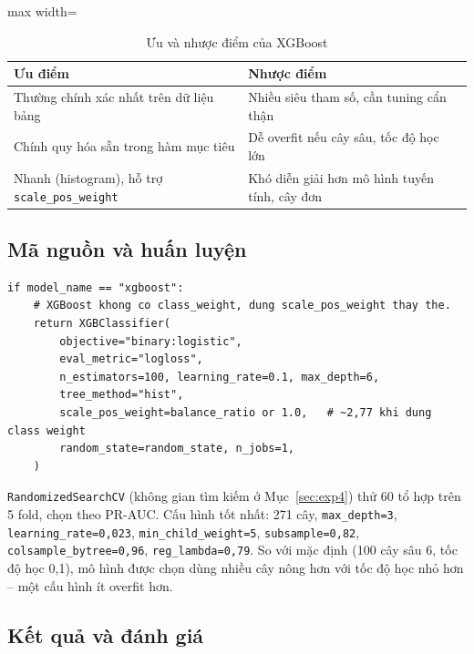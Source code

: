 \begin{table}[H]
\centering
\begin{adjustbox}{max width=\textwidth}
\begin{tabular}{|p{7cm}|p{7cm}|}
\hline
\textbf{Ưu điểm} & \textbf{Nhược điểm} \\
\hline
Thường chính xác nhất trên dữ liệu bảng & Nhiều siêu tham số, cần tuning cẩn thận \\
\hline
Chính quy hóa sẵn trong hàm mục tiêu & Dễ overfit nếu cây sâu, tốc độ học lớn \\
\hline
Nhanh (histogram), hỗ trợ \texttt{scale\_pos\_weight} & Khó diễn giải hơn mô hình tuyến tính, cây đơn \\
\hline
\end{tabular}
\end{adjustbox}
\caption{Ưu và nhược điểm của XGBoost}
\end{table}

\subsection{Mã nguồn và huấn luyện}
\begin{lstlisting}[style=pythonstyle, caption={Khởi tạo XGBoost trong \texttt{src/models.py}}]
if model_name == "xgboost":
    # XGBoost khong co class_weight, dung scale_pos_weight thay the.
    return XGBClassifier(
        objective="binary:logistic",
        eval_metric="logloss",
        n_estimators=100, learning_rate=0.1, max_depth=6,
        tree_method="hist",
        scale_pos_weight=balance_ratio or 1.0,   # ~2,77 khi dung class weight
        random_state=random_state, n_jobs=1,
    )
\end{lstlisting}

\texttt{RandomizedSearchCV} (không gian tìm kiếm ở Mục~\ref{sec:exp4}) thử 60 tổ hợp trên 5 fold, chọn theo PR-AUC. Cấu hình tốt nhất: 271 cây, \texttt{max\_depth=3}, \texttt{learning\_rate=0,023}, \texttt{min\_child\_weight=5}, \texttt{subsample=0,82}, \texttt{colsample\_bytree=0,96}, \texttt{reg\_lambda=0,79}. So với mặc định (100 cây sâu 6, tốc độ học 0,1), mô hình được chọn dùng nhiều cây nông hơn với tốc độ học nhỏ hơn -- một cấu hình ít overfit hơn.

\subsection{Kết quả và đánh giá}

